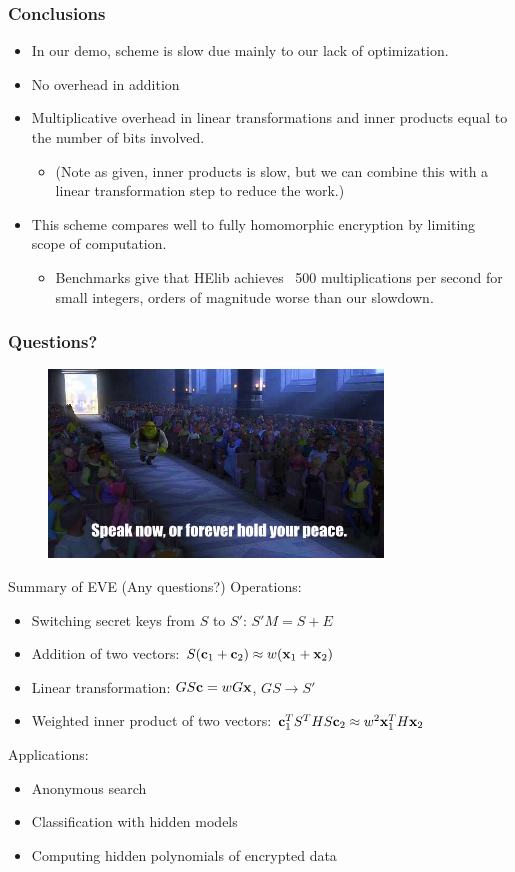 \documentclass{beamer}
\newcommand{\itz}[1]{\begin{itemize}#1\end{itemize}} %
\newcommand{\bbc}{{\bf c}} %
\newcommand{\bbx}{{\bf x}} %
\begin{document}
\begin{frame}
\frametitle{Conclusions}
\itz{
\item{In our demo, scheme is slow due mainly to our lack of optimization.}
\vspace{.1in}
\item{No overhead in addition}
\item{Multiplicative overhead in linear transformations and inner products equal to the number of bits involved.
	\itz{
		\item{(Note as given, inner products is slow, but we can combine this with a linear transformation step to reduce the work.)}
	}
}
\vspace{.1in}
\item{This scheme compares well to fully homomorphic encryption by limiting scope of computation.
	\itz{
		\item{Benchmarks give that HElib achieves ~500 multiplications per second for small integers, orders of magnitude worse than our slowdown.}
	}
}
}
\end{frame}


\begin{frame}
\frametitle{Questions?}
\begin{figure}[ht]
\centering
\includegraphics[width=3.5in]{questions}
\end{figure}
\end{frame}


\begin{frame}{Summary of EVE  (Any questions?)}
Operations:
\itz{
\item{Switching secret keys from $S$ to $S'$: $S'M = S + E$}
\item{Addition of two vectors: $S(\bbc_1 + \bbc_2) \approx w(\bbx_1 + \bbx_2)$}
\item{Linear transformation: $GS\bbc = wG\bbx$, $GS \rightarrow S'$}
\item{Weighted inner product of two vectors: $\bbc_1^T S^T H S \bbc_2 \approx w^2 \bbx_1^T H \bbx_2$}
}
\vspace{0.15in}
Applications:
\itz{
\item{Anonymous search}
\item{Classification with hidden models}
\item{Computing hidden polynomials of encrypted data}
}
\end{frame}
\end{document}
